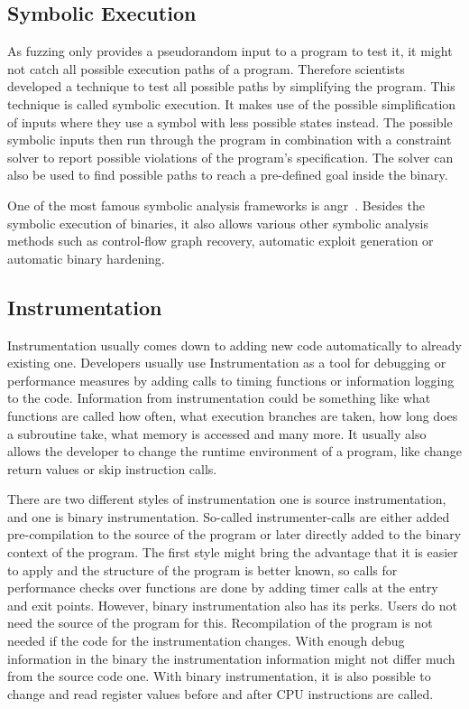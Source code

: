 
\subsection{Symbolic Execution}

As fuzzing only provides a pseudorandom input to a program to test it, it might
not catch all possible execution paths of a program. Therefore scientists
developed a technique to test all possible paths by simplifying the program.
This technique is called symbolic execution. It makes use of the possible
simplification of inputs where they use a symbol with less possible states
instead. The possible symbolic inputs then run through the program in
combination with a constraint solver to report possible violations of the
program's specification. The solver can also be used to find possible paths to
reach a pre-defined goal inside the binary.

One of the most famous symbolic analysis frameworks is angr~\cite{angrpaper}.
Besides the symbolic execution of binaries, it also allows various other
symbolic analysis methods such as control-flow graph recovery, automatic exploit
generation or automatic binary hardening.


\subsection{Instrumentation}

Instrumentation usually comes down to adding new code automatically to already
existing one. Developers usually use Instrumentation as a tool for debugging or
performance measures by adding calls to timing functions or information logging
to the code. Information from instrumentation could be something like what
functions are called how often, what execution branches are taken, how long does
a subroutine take, what memory is accessed and many more. It usually also allows
the developer to change the runtime environment of a program, like change return
values or skip instruction calls.

There are two different styles of instrumentation one is source instrumentation,
and one is binary instrumentation. So-called instrumenter-calls are either added
pre-compilation to the source of the program or later directly added to the
binary context of the program. The first style might bring the advantage that it
is easier to apply and the structure of the program is better known, so calls
for performance checks over functions are done by adding timer calls at the
entry and exit points. However, binary instrumentation also has its perks. Users
do not need the source of the program for this. Recompilation of the program is
not needed if the code for the instrumentation changes. With enough debug
information in the binary the instrumentation information might not differ much
from the source code one. With binary instrumentation, it is also possible to
change and read register values before and after CPU instructions are called.

